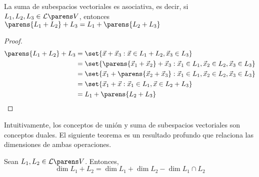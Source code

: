 \documentclass[../algebra_lineal.tex]{subfiles}
\begin{document}
\begin{proposition}
    La suma de subespacios vectoriales es asociativa, es decir, si $L_1, L_2, L_3 \in \subespaciosde{V}$, entonces  $\parens{L_1 + L_2} + L_3 = L_1 + \parens{L_2 + L_3}$
\end{proposition}
\begin{proof}
    \begin{align*}
        \parens{L_1 + L_2} + L_3 &= \set{\vx + \vx_3 : \vx \in L_1 + L_2, \vx_3 \in L_3}\\
            &= \set{\parens{\vx_1 + \vx_ 2} + \vx_3 : \vx_1 \in L_1, \vx_2 \in L_2, \vx_3 \in L_3}\\
            &= \set{\vx_1 + \parens{\vx_ 2 + \vx_3} : \vx_1 \in L_1, \vx_2 \in L_2, \vx_3 \in L_3}\\
            &= \set{\vx_1 + \vx : \vx_1 \in L_1, \vx \in L_2 + L_3} \\
            &= L_1 + \parens{L_2 + L_3}
    \end{align*}
\end{proof}

Intuitivamente, los conceptos de unión y suma de subespacios vectoriales son conceptos duales. El siguiente teorema es un resultado profundo que relaciona las dimensiones de ambas operaciones.

\begin{theorem} 
    Sean $L_1, L_2 \in \subespaciosde{V}$. Entonces,
    \[
        \dim{L_1 + L_2} = \dim{L_1} + \dim{L_2} - \dim{L_1 \cap L_2}
    \]
\end{theorem}
\end{document}
